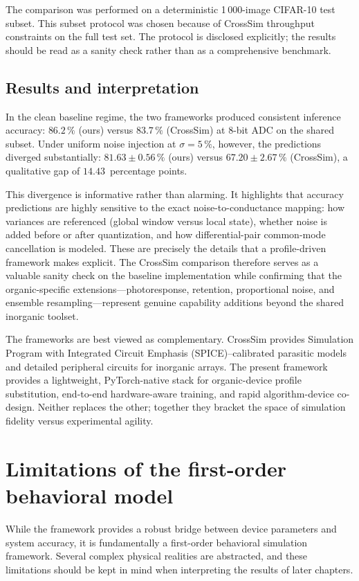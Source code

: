 The comparison was performed on a deterministic 1\,000-image CIFAR-10 test subset. This subset protocol was chosen because of CrossSim throughput constraints on the full test set. The protocol is disclosed explicitly; the results should be read as a sanity check rather than as a comprehensive benchmark.

\subsection{Results and interpretation}

In the clean baseline regime, the two frameworks produced consistent inference accuracy: $86.2\,\%$ (ours) versus $83.7\,\%$ (CrossSim) at 8-bit ADC on the shared subset. Under uniform noise injection at $\sigma=5\,\%$, however, the predictions diverged substantially: $81.63\pm0.56\,\%$ (ours) versus $67.20\pm2.67\,\%$ (CrossSim), a qualitative gap of $14.43$~percentage points.

This divergence is informative rather than alarming. It highlights that accuracy predictions are highly sensitive to the exact noise-to-conductance mapping: how variances are referenced (global window versus local state), whether noise is added before or after quantization, and how differential-pair common-mode cancellation is modeled. These are precisely the details that a profile-driven framework makes explicit. The CrossSim comparison therefore serves as a valuable sanity check on the baseline implementation while confirming that the organic-specific extensions—photoresponse, retention, proportional noise, and ensemble resampling—represent genuine capability additions beyond the shared inorganic toolset.

The frameworks are best viewed as complementary. CrossSim provides Simulation Program with Integrated Circuit Emphasis (SPICE)--calibrated parasitic models and detailed peripheral circuits for inorganic arrays. The present framework provides a lightweight, PyTorch-native stack for organic-device profile substitution, end-to-end hardware-aware training, and rapid algorithm-device co-design. Neither replaces the other; together they bracket the space of simulation fidelity versus experimental agility.

\section{Limitations of the first-order behavioral model}

While the framework provides a robust bridge between device parameters and system accuracy, it is fundamentally a first-order behavioral simulation framework. Several complex physical realities are abstracted, and these limitations should be kept in mind when interpreting the results of later chapters.

